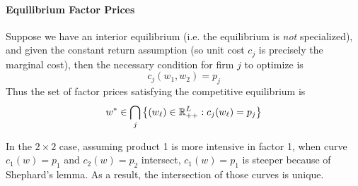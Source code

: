 \documentclass{report}
\begin{document}
			\paragraph{Equilibrium Factor Prices} Suppose we have an interior equilibrium (i.e. the equilibrium is \emph{not} specialized), and given the constant return assumption (so unit cost $c_j$ is precisely the marginal cost), then the necessary condition for firm $j$ to optimize is
			\begin{equation}
				c_j(w_1, w_2) = p_j
			\end{equation}
			Thus the set of factor prices satisfying the competitive equilibrium is 
			\begin{equation}
				w^* \in \bigcap_j \left \{
				(w_\ell) \in \mathbb{R}^L_{++}: c_j(w_\ell) = p_j
				\right \}
			\end{equation}
			\begin{remark}
				In the $2 \times 2$ case, assuming product 1 is more intensive in factor 1, when curve $c_1(w)=p_1$ and $c_2(w)=p_2$ intersect, $c_1(w)=p_1$ is steeper because of Shephard's lemma. As a result, the intersection of those curves is unique.
			\end{remark}
			
\end{document}

